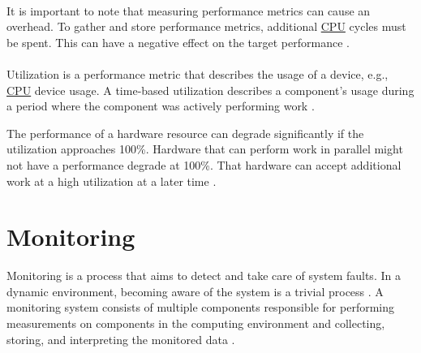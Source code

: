 \paragraph{}It is important to note that measuring performance metrics can cause an overhead. To gather and store performance metrics, additional \hyperlink{abbr:cpu}{CPU} cycles must be spent. This can have a negative effect on the target performance \cite{Greg2020SysPerf}.


\paragraph{}
Utilization is a performance metric that describes the usage of a device, e.g., \hyperlink{abbr:cpu}{CPU} device usage.
A time-based utilization describes a component's usage during a period where the component was actively performing work \cite{Greg2020SysPerf}.


The performance of a hardware resource can degrade significantly if the utilization approaches 100\%.
Hardware that can perform work in parallel might not have a performance degrade at 100\%. That hardware can accept additional work at a high utilization at a later time \cite{Greg2020SysPerf}.


\section{Monitoring}
\label{sec:02_monitoring}
Monitoring is a process that aims to detect and take care of system faults. In a dynamic environment, becoming aware of the system is a trivial process \cite{Ligus2012EffMonitoring}.
A monitoring system consists of multiple components responsible for performing measurements on components in the computing environment and collecting, storing, and interpreting the monitored data \cite{Ligus2012EffMonitoring}. 


